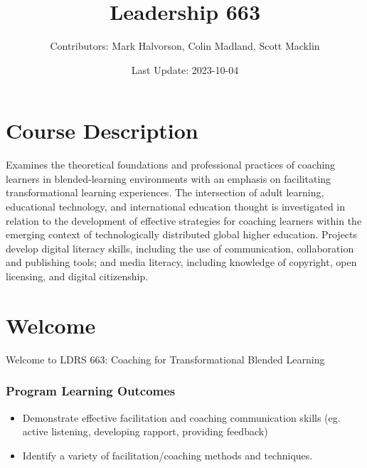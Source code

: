\documentclass[
]{book}
\title{Leadership 663}
\author{Contributors: Mark Halvorson, Colin Madland, Scott Macklin}
\date{Last Update: 2023-10-04}
\providecommand{\tightlist}{%
  \setlength{\itemsep}{0pt}\setlength{\parskip}{0pt}}
\begin{document}
\maketitle

{
\setcounter{tocdepth}{1}
\tableofcontents
}
\hypertarget{course-description}{%
\chapter*{Course Description}\label{course-description}}

Examines the theoretical foundations and professional practices of coaching learners in blended-learning environments with an emphasis on facilitating transformational learning experiences. The intersection of adult learning, educational technology, and international education thought is investigated in relation to the development of effective strategies for coaching learners within the emerging context of technologically distributed global higher education. Projects develop digital literacy skills, including the use of communication, collaboration and publishing tools; and media literacy, including knowledge of copyright, open licensing, and digital citizenship.

\hypertarget{welcome}{%
\chapter*{Welcome}\label{welcome}}

Welcome to LDRS 663: Coaching for Transformational Blended Learning

\hypertarget{program-learning-outcomes}{%
\subsection*{Program Learning Outcomes}\label{program-learning-outcomes}}

\begin{itemize}
\tightlist
\item
  Demonstrate effective facilitation and coaching communication skills (eg. active listening, developing rapport, providing feedback)\\
\item
  Identify a variety of facilitation/coaching methods and techniques.
\end{itemize}
\end{document}
